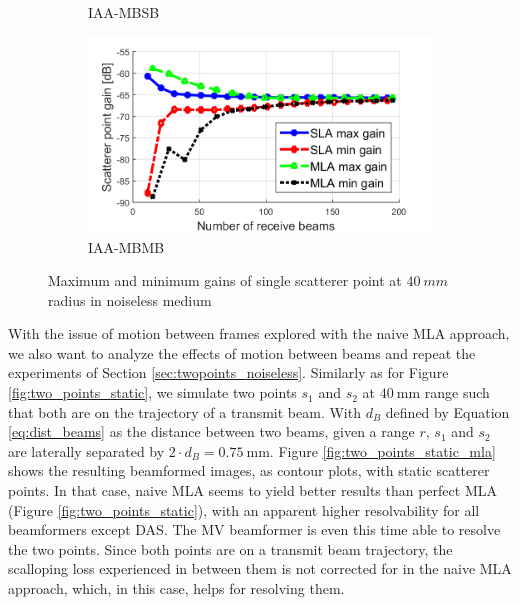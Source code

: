 \begin{figure}[ht]
\begin{subfigure}[t]{0.48\linewidth}
        \caption{IAA-MBSB}
    \end{subfigure}
    \quad
    \begin{subfigure}[t]{0.48\linewidth}
        \includegraphics[width=\linewidth]{./images/results/4/gain_IAA-MBMB.png}
        \caption{IAA-MBMB}
    \end{subfigure}
	\caption{Maximum and minimum gains of single scatterer point at $40~mm$ radius in noiseless medium}
	\label{fig:gain_comparison}
\end{figure}

With the issue of motion between frames explored with the naive MLA approach, we also want to analyze the effects of motion between beams and repeat the experiments of Section \ref{sec:twopoints_noiseless}.
Similarly as for Figure \ref{fig:two_points_static}, we simulate two points $s_1$ and $s_2$ at $40~$mm range such that both are on the trajectory of a transmit beam. With $d_B$ defined by Equation \ref{eq:dist_beams} as the distance between two beams, given a range $r$, $s_1$ and $s_2$ are laterally separated by $2 \cdot d_B = 0.75~$mm.
Figure \ref{fig:two_points_static_mla} shows the resulting beamformed images, as contour plots, with static scatterer points.
In that case, naive MLA seems to yield better results than perfect MLA (Figure \ref{fig:two_points_static}), with an apparent higher resolvability for all beamformers except DAS. The MV beamformer is even this time able to resolve the two points.
Since both points are on a transmit beam trajectory, the scalloping loss experienced in between them is not corrected for in the naive MLA approach, which, in this case, helps for resolving them.

